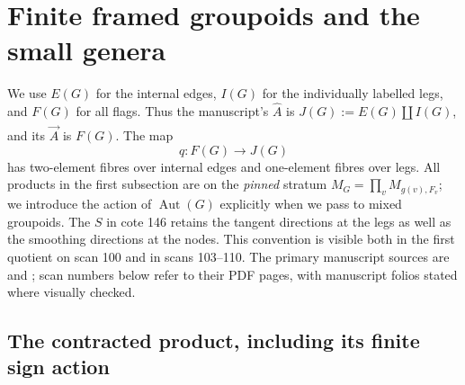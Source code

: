 \section{Finite framed groupoids and the small genera}
\label{sec:B}

We use $E(G)$ for the internal edges, $I(G)$ for the individually
labelled legs, and $F(G)$ for all flags.  Thus the manuscript's
$\widehat A$ is $J(G):=E(G)\amalg I(G)$, and its
$\widehat{\vec A}$ is $F(G)$.  The map
\[
 q:F(G)\longrightarrow J(G)
\]
has two-element fibres over internal edges and one-element fibres over
legs.  All products in the first subsection are on the \emph{pinned}
stratum $M_G=\prod_v M_{g(v),F_v}$; we introduce the action of
$\operatorname{Aut}(G)$ explicitly when we pass to mixed groupoids.
The $S$ in cote 146 retains the tangent directions at the legs as well
as the smoothing directions at the nodes.  This convention is visible
both in the first quotient on scan 100 and in scans 103--110.
The primary manuscript sources are \citet{B_Grothendieck146}
and \citet{B_Grothendieck148}; scan numbers below refer to their
PDF pages, with manuscript folios stated where visually checked.

\subsection{The contracted product, including its finite sign action}

